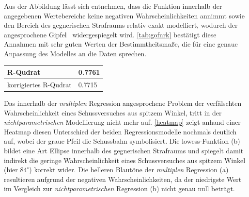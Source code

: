 Aus der Abbildung lässt sich entnehmen, dass die Funktion innerhalb der angegebenen Wertebereiche keine negativen Wahrscheinlichkeiten annimmt sowie den Bereich des gegnerischen Strafraums relativ exakt modelliert, wodurch der angesprochene \glqq Gipfel\grqq~ widergespiegelt wird. \vref{tab:gofnrk} bestätigt diese Annahmen mit sehr guten Werten der Bestimmtheitsmaße, die für eine genaue Anpassung des Modelles an die Daten sprechen.

\tablehead{}
\tabletail{}
\tablelasttail{}
\begin{center}%
\begin{supertabular}{ | P{6cm} | P{3cm}  |}
\textsf{R-Qudrat} 	& 0.7761	\\
\hline
\textsf{korrigiertes R-Qudrat} 	&  0.7715	\\
\hline
\end{supertabular}
\end{center}

Das innerhalb der \textit{multiplen} Regression angesprochene Problem der verfälschten Wahrscheinlichkeit eines Schussversuches aus spitzem Winkel, tritt in der \textit{nichtparametrischen} Modellierung nicht mehr auf. \vref{heatmap} zeigt anhand einer Heatmap diesen Unterschied der beiden Regressionsmodelle nochmals deutlich auf, wobei der graue Pfeil die Schussbahn symbolisiert. Die \gls{lowess}-Funktion (b) bildet eine Art Ellipse innerhalb des gegnerischen Strafraums und spiegelt damit indirekt die geringe Wahrscheinlichkeit eines Schussversuches aus spitzem Winkel (hier $84^\circ$) korrekt wider. Die helleren Blautöne der \textit{multiplen} Regression (a) resultieren aufgrund der negativen Wahrscheinlichkeiten, da der niedrigste Wert im Vergleich zur \textit{nichtparametrischen} Regression (b) nicht genau null beträgt.

